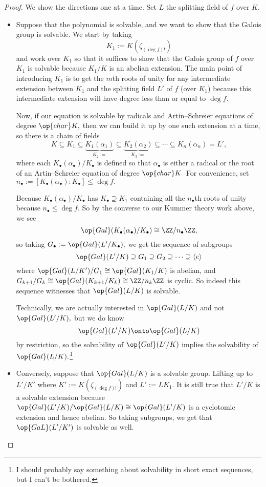 \documentclass[../notes.tex]{subfiles}
\begin{document}
\begin{proof}
	We show the directions one at a time. Set $L$ the splitting field of $f$ over $K.$
	\begin{itemize}
		\item Suppose that the polynomial is solvable, and we want to show that the Galois group is solvable. We start by taking
		\[K_1:=K(\zeta_{(\deg f)!})\]
		and work over $K_1$ so that it suffices to show that the Galois group of $f$ over $K_1$ is solvable because $K_1/K$ is an abelian extension. The main point of introducing $K_1$ is to get the $m$th roots of unity for any intermediate extension between $K_1$ and the splitting field $L'$ of $f$ (over $K_1$) because this intermediate extension will have degree less than or equal to $\deg f.$
		
		Now, if our equation is solvable by radicals and Artin--Schreier equations of degree $\op{char}K,$ then we can build it up by one such extension at a time, so there is a chain of fields
		\[K\subseteq K_1\subseteq \underbrace{K_1(\alpha_1)}_{K_2:=}\subseteq \underbrace{K_2(\alpha_2)}_{K_3:=}\subseteq\cdots\subseteq K_n(\alpha_n)= L',\]
		where each $K_\bullet(\alpha_\bullet)/K_\bullet$ is defined so that $\alpha_\bullet$ is either a radical or the root of an Artin--Schreier equation of degree $\op{char}K.$ For convenience, set $n_\bullet:=[K_\bullet(\alpha_\bullet):K_\bullet]\le\deg f.$
		
		Because $K_\bullet(\alpha_\bullet)/K_\bullet$ has $K_\bullet\supseteq K_1$ containing all the $n_\bullet$th roots of unity because $n_\bullet\le\deg f.$ So by the converse to our Kummer theory work above, we see
		\[\op{Gal}(K_\bullet(\alpha_\bullet)/K_\bullet)\cong\ZZ/n_\bullet\ZZ,\]
		so taking $G_\bullet:=\op{Gal}(L'/K_\bullet),$ we get the sequence of subgroups
		\[\op{Gal}(L'/K)\supseteq G_1\supseteq G_2\supseteq\cdots\supseteq\langle e\rangle\]
		where $\op{Gal}(L/K')/G_1\cong\op{Gal}(K_1/K)$ is abelian, and $G_{k+1}/G_k\cong\op{Gal}(K_{k+1}/K_k)\cong\ZZ/n_k\ZZ$ is cyclic. So indeed this sequence witnesses that $\op{Gal}(L/K)$ is solvable.

		Technically, we are actually interested in $\op{Gal}(L/K)$ and not $\op{Gal}(L'/K),$ but we do know
		\[\op{Gal}(L'/K)\onto\op{Gal}(L/K)\]
		by restriction, so the solvability of $\op{Gal}(L'/K)$ implies the solvability of $\op{Gal}(L/K).$\footnote{I should probably say something about solvability in short exact sequences, but I can't be bothered.}
		\item Conversely, suppose that $\op{Gal}(L/K)$ is a solvable group. Lifting up to $L'/K'$ where $K':=K(\zeta_{(\deg f)!})$ and $L':=LK_1.$ It is still true that $L'/K$ is a solvable extension because $\op{Gal}(L'/K)/\op{Gal}(L/K)\cong\op{Gal}(L'/K)$ is a cyclotomic extension and hence abelian. So taking subgroups, we get that $\op{GaL}(L'/K')$ is solvable as well.


\end{itemize}
\end{proof}
\end{document}
